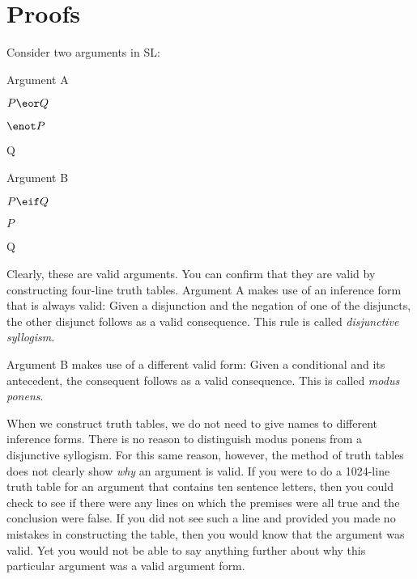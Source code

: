 

\chapter{Proofs}
\label{ch.proofs}

Consider two arguments in SL:

\begin{multicols}{2}
Argument A
\begin{earg}
\item[] $P \eor Q$
\item[] $\enot P$
\item[\therefore] Q
\end{earg}

Argument B
\begin{earg}
\item[] $P \eif Q$
\item[] $P$
\item[\therefore] Q
\end{earg}

\end{multicols}

Clearly, these are valid arguments. You can confirm that they are valid by constructing four-line truth tables. Argument A makes use of an inference form that is always valid: Given a disjunction and the negation of one of the disjuncts, the other disjunct follows as a valid consequence. This rule is called \emph{disjunctive syllogism}.

Argument B makes use of a different valid form: Given a conditional and its antecedent, the consequent follows as a valid consequence. This is called \emph{modus ponens}.

 When we construct truth tables, we do not need to give names to different inference forms. There is no reason to distinguish modus ponens from a disjunctive syllogism. For this same reason, however, the method of truth tables does not clearly show \emph{why} an argument is valid. If you were to do a 1024-line truth table for an argument that contains ten sentence letters, then you could check to see if there were any lines on which the premises were all true and the conclusion were false. If you did not see such a line and provided you made no mistakes in constructing the table, then you would know that the argument was valid. Yet you would not be able to say anything further about why this particular argument was a valid argument form.

